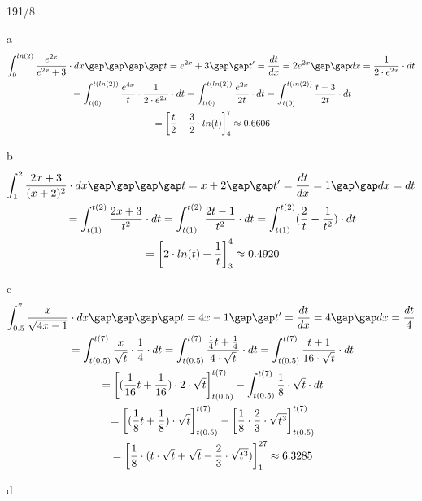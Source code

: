 \begin{exercise}{191/8}
  \item [a]
  \begin{gather*}
    \int_0^{ln(2)} \frac{e^{2x}}{e^{2x} + 3} \cdot dx \gap\gap\gap\gap t = e^{2x} + 3 \gap\gap t' = \frac{dt}{dx} = 2e^{2x} \gap\gap dx = \frac{1}{2 \cdot e^{2x}} \cdot dt \\
    \;= \int_{t(0)}^{t(ln(2))} \frac{e^{4x}}{t} \cdot \frac{1}{2 \cdot e^{2x}} \cdot dt = \int_{t(0)}^{t(ln(2))} \frac{e^{2x}}{2t} \cdot dt = \int_{t(0)}^{t(ln(2))} \frac{t - 3}{2t} \cdot dt \\
    \;= \left[\frac{t}{2} - \frac{3}{2} \cdot ln(t)\right]_4^7 \approx 0.6606
  \end{gather*}
  \item [b]
  \begin{gather*}
    \int_1^2 \frac{2x + 3}{(x + 2)^2} \cdot dx \gap\gap\gap\gap t = x + 2 \gap\gap t' = \frac{dt}{dx} = 1 \gap\gap dx = dt \\
    \;= \int_{t(1)}^{t(2)} \frac{2x + 3}{t^2} \cdot dt = \int_{t(1)}^{t(2)} \frac{2t - 1}{t^2} \cdot dt = \int_{t(1)}^{t(2)} (\frac{2}{t} - \frac{1}{t^2}) \cdot dt \\
    \;= \left[2 \cdot ln(t) + \frac{1}{t}\right]_3^4 \approx 0.4920
  \end{gather*}
  \item [c]
  \begin{gather*}
    \int_{0.5}^7 \frac{x}{\sqrt{4x - 1}} \cdot dx \gap\gap\gap\gap t = 4x - 1 \gap\gap t' = \frac{dt}{dx} = 4 \gap\gap dx = \frac{dt}{4} \\
    \;= \int_{t(0.5)}^{t(7)} \frac{x}{\sqrt{t}} \cdot \frac{1}{4} \cdot dt = \int_{t(0.5)}^{t(7)} \frac{\frac{1}{4}t + \frac{1}{4}}{4 \cdot \sqrt{t}} \cdot dt = \int_{t(0.5)}^{t(7)} \frac{t + 1}{16 \cdot \sqrt{t}} \cdot dt \\
    \;= \left[(\frac{1}{16}t + \frac{1}{16}) \cdot 2 \cdot \sqrt{t}\right]_{t(0.5)}^{t(7)} - \int_{t(0.5)}^{t(7)} \frac{1}{8} \cdot \sqrt{t} \cdot dt \\
    \;= \left[(\frac{1}{8}t + \frac{1}{8}) \cdot \sqrt{t}\right]_{t(0.5)}^{t(7)} - \left[\frac{1}{8} \cdot \frac{2}{3} \cdot \sqrt{t^3}\right]_{t(0.5)}^{t(7)} \\
    \;= \left[\frac{1}{8} \cdot (t \cdot \sqrt{t} + \sqrt{t} - \frac{2}{3} \cdot \sqrt{t^3})\right]_1^{27} \approx 6.3285
  \end{gather*}
  \item [d]
  \begin{gather*}

\end{gather*}
\end{exercise}
